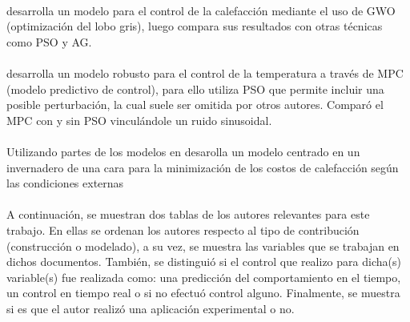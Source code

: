 \documentclass[12pt,a4paper]{article}
\begin{document}
{		
	\paragraph{\cite{Singhal2017}} desarrolla un modelo para el control de la calefacción mediante el uso de GWO (optimización del lobo gris), luego compara sus resultados con otras técnicas como PSO y AG.


		
	\paragraph{\cite{Chen2018}} desarrolla un modelo robusto para el control de la temperatura a través de MPC (modelo predictivo de control), para ello utiliza PSO que permite incluir una posible perturbación, la cual suele ser omitida por otros autores. Comparó el MPC con y sin PSO vinculándole un ruido sinusoidal.
	
	
	\paragraph{\cite{Dong2018}} Utilizando partes de los modelos en \cite{Gijzen1998} desarolla un modelo centrado en un invernadero de una cara para la minimización de los costos de calefacción según las condiciones externas
	}	
		
		\paragraph{}	%
		A continuación, se muestran dos tablas de los autores relevantes para este trabajo. En ellas se ordenan los autores respecto al tipo de contribución (construcción o modelado), a su vez, se muestra las variables que se trabajan en dichos documentos. También, se distinguió si el control que realizo para dicha(s) variable(s) fue realizada como: una predicción del comportamiento en el tiempo, un control en tiempo real o si no efectuó control alguno. Finalmente, se muestra si es que el autor realizó una aplicación experimental o no.
	
\end{document}
